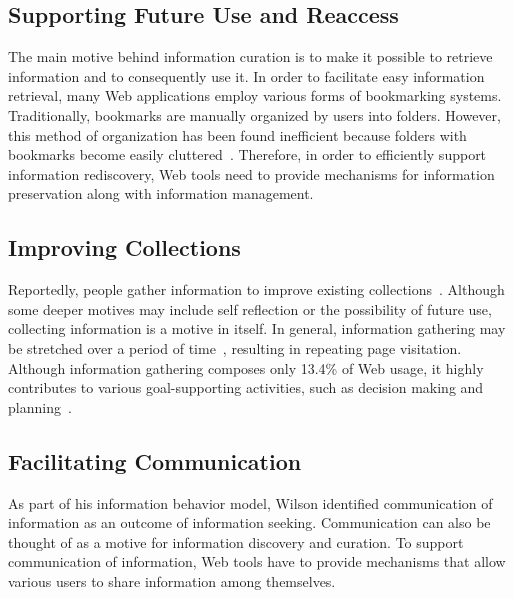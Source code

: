 {{\subsection{Supporting Future Use and Reaccess}
The main motive behind information curation is to make it possible to retrieve information and to consequently use it. In order to facilitate easy information retrieval, many Web applications employ various forms of bookmarking systems. Traditionally, bookmarks are manually organized by users into folders. However, this method of organization has been found inefficient because folders with bookmarks become easily cluttered~\cite{abrams1998information}. Therefore, in order to efficiently support information rediscovery, Web tools need to provide mechanisms for information preservation along with information management.
}

{\subsection{Improving Collections}
Reportedly, people gather information to improve existing collections~\cite{lindley2012s}. Although some deeper motives may include self reflection or the possibility of future use, collecting information is a motive in itself. In general, information gathering may be stretched over a period of time~\cite{kellar2006goal}, resulting in repeating page visitation. Although information gathering composes only 13.4\% of Web usage, it highly contributes to various goal-supporting activities, such as decision making and planning~\cite{kellar2006goal}.

}

{\subsection{Facilitating Communication}
As part of his information behavior model, Wilson identified communication of information as an outcome of information seeking. Communication can also be thought of as a motive for information discovery and curation. To support communication of information, Web tools have to provide mechanisms that allow various users to share information among themselves. 

}}
